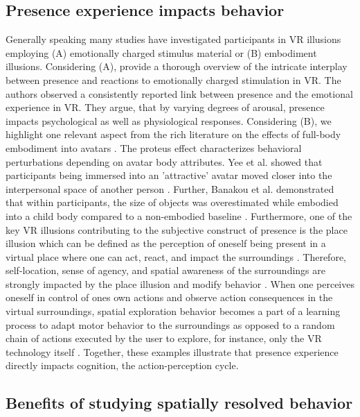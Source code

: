 \subsection{Presence experience impacts behavior}
Generally speaking many studies have investigated participants in VR illusions employing (A) emotionally charged stimulus material or (B) embodiment illusions. Considering (A), \cite{Diemer2015} provide a thorough overview of the intricate interplay between presence and reactions to emotionally charged stimulation in VR. The authors observed a consistently reported link between presence and the emotional experience in VR. They argue, that by varying degrees of arousal, presence impacts psychological as well as physiological responses. Considering (B), we highlight one relevant aspect from the rich literature on the effects of full-body embodiment into avatars \cite{Maister2015}. The proteus effect characterizes behavioral perturbations depending on avatar body attributes. Yee et al. showed that participants being immersed into an 'attractive' avatar moved closer into the interpersonal space of another person \cite{Yee2007}. Further, Banakou et al. demonstrated that within participants, the size of objects was overestimated while embodied into a child body compared to a non-embodied baseline \cite{Banakou2013}. Furthermore, one of the key VR illusions contributing to the subjective construct of presence is the place illusion which can be defined as the perception of oneself being present in a virtual place where one can act, react, and impact the surroundings \cite{Slater2009}. Therefore, self-location, sense of agency, and spatial awareness of the surroundings are strongly impacted by the place illusion and modify behavior \cite{Kilteni2012}. When one perceives oneself in control of ones own actions and observe action consequences in the virtual surroundings, spatial exploration behavior becomes a part of a learning process to adapt motor behavior to the surroundings as opposed to a random chain of actions executed by the user to explore, for instance, only the VR technology itself \cite{Tan2011}. Together, these examples illustrate that presence experience directly impacts cognition, the action-perception cycle.

\subsection{Benefits of studying spatially resolved behavior}



